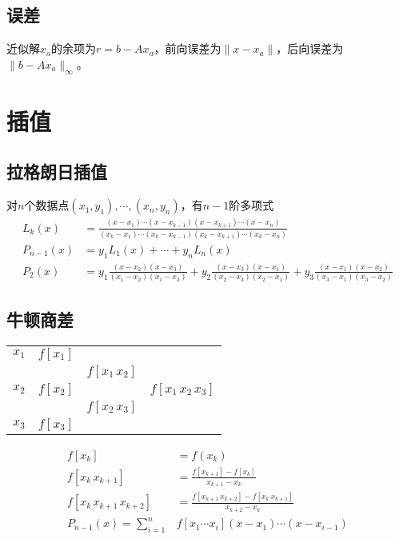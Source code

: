 \documentclass[twocolumn]{article}
\begin{document}
\subsection{误差}
近似解$x_a$的余项为$r=b-Ax_a$，前向误差为$\|x-x_a\|$，后向误差为$\|b-Ax_a\|_\infty$。

\section{插值}

\subsection{拉格朗日插值}
对$n$个数据点$(x_1,y_1),\cdots,(x_n,y_n)$，有$n-1$阶多项式
\begin{align*}
    L_k(x)     & =\frac{(x-x_1)\cdots(x-x_{k-1})(x-x_{k+1})\cdots(x-x_n)}{(x_k-x_1)\cdots(x_k-x_{k-1})(x_k-x_{k+1})\cdots(x_k-x_n)}                      \\
    P_{n-1}(x) & =y_1L_1(x)+\cdots+y_nL_n(x)                                                                                                             \\
    P_2(x)     & =y_1\frac{(x-x_2)(x-x_3)}{(x_1-x_2)(x_1-x_3)}+y_2\frac{(x-x_3)(x-x_1)}{(x_2-x_3)(x_2-x_1)}+y_3\frac{(x-x_1)(x-x_2)}{(x_3-x_1)(x_3-x_2)}
\end{align*}

\subsection{牛顿商差}
\noindent
\begin{minipage}{0.42\linewidth}
    \begin{center}
        \begin{tabular}{c|ccc}
            $x_1$ & $f[x_1]$ &                 &                        \\
                  &          & $f[x_1 \, x_2]$ &                        \\
            $x_2$ & $f[x_2]$ &                 & $f[x_1 \, x_2 \, x_3]$ \\
                  &          & $f[x_2 \, x_3]$ &                        \\
            $x_3$ & $f[x_3]$ &                 &
        \end{tabular}
    \end{center}
\end{minipage}
\begin{minipage}{0.5\linewidth}
    \begin{align*}
        f[x_k]                       & =f(x_k)                                                      \\
        f[x_k \, x_{k+1}]            & =\frac{f[x_{k+1}]-f[x_k]}{x_{k+1}-x_k}                       \\
        f[x_k \, x_{k+1} \, x_{k+2}] & =\frac{f[x_{k+1} \, x_{k+2}]-f[x_k \, x_{k+1}]}{x_{k+2}-x_k} \\
        P_{n-1}(x)=\sum_{i=1}^n      & f[x_1\cdots x_i](x-x_1)\cdots(x-x_{i-1})
    \end{align*}
\end{minipage}
\end{document}
